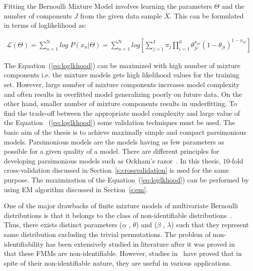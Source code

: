 Fitting the Bernoulli Mixture Model involves learning the parameters $\Theta$ and the number of components $J$ from the given data sample $\overline{{X}}$. This can be formulated in terms of loglikelihood as:

\begin{eqnarray}
\label{eq:loglkhood}
\mathcal{L} (\Theta)= \displaystyle\sum_{n=1}^{\mathrm{N}} log \; P(x_n|\Theta) = \displaystyle\sum_{n=1}^{\mathrm{N}} log  \left [ \displaystyle\sum_{j=1}^{\mathrm{J}} \pi_j \displaystyle \prod _{i=1} ^{\mathrm{d}} \theta_{ji}^{x_{ni}} (1-\theta_{ji})^{1-x_{ni}} \right]
\end{eqnarray} 


The Equation~(\ref{eq:loglkhood}) can be maximized with high number of mixture components i.e. the mixture models gets high likelihood values for the training set. However, large number of mixture components increases model complexity and often results in overfitted model generalizing poorly on future data. On the other hand, smaller number of mixture components results in underfitting. To find the trade-off between the appropriate model complexity and large value of the Equation ~(\ref{eq:loglkhood}) some validation techniques must be used. The basic aim of the thesis is to achieve maximally simple and compact parsimonious models. Parsimonious models are the models having as few parameters as possible for a given quality of a model. There are different principles for developing parsimonious models such as Ockham's razor~\cite{occam}. In this thesis, $10$-fold cross-validation discussed in Section~\ref{s:crossvalidation} is used for the same purpose. The maximization of the Equation~(\ref{eq:loglkhood}) can be performed by using EM algorithm discussed in Section~\ref{s:em}.

One of the major drawbacks of finite mixture models of multivariate Bernoulli distributions is that it belongs to the class of non-identifiable distributions~\cite{nonidentifiable}. Thus, there exists distinct parameters ($\alpha$ , $\theta$) and ($\beta$ , $\lambda$) such that they represent same distribution excluding the trivial permutations. The problem of non-identifiability has been extensively studied in literature after it was proved in~\cite{nonidentifiable, furthernoni} that these FMMs are non-identifiable. However, studies in~\cite{furthernoni} have proved that in spite of their non-identifiable nature, they are useful in various applications. 

